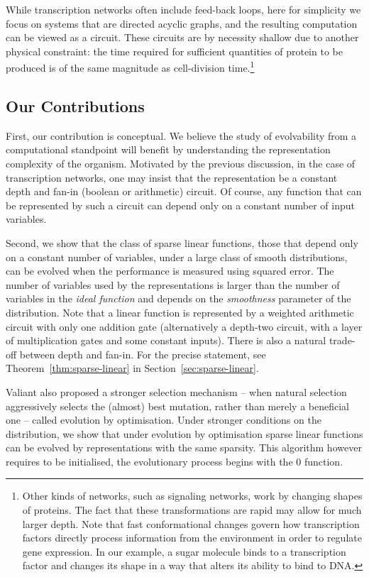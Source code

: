 While transcription networks often include feed-back loops, here for simplicity
we focus on systems that are directed acyclic graphs, and the resulting
computation can be viewed as a circuit.
These circuits are by necessity shallow due to another physical constraint: the
time required for sufficient quantities of protein to be produced is of the same
magnitude as cell-division time.\footnote{Other kinds of networks, such as
signaling networks, work by changing shapes of proteins. The fact that these
transformations are rapid may allow for much larger depth.
Note that fast conformational changes govern how transcription factors directly
process information from the environment in order to regulate gene expression.
In our example, a sugar molecule binds to a transcription factor and changes
its shape in a way that alters its ability to bind to DNA.}

\subsection{Our Contributions}

First, our contribution is conceptual. We believe the study of evolvability from
a computational standpoint will benefit by understanding the representation
complexity of the organism. Motivated by the previous discussion, in the case of
transcription networks, one may insist that the representation be a
constant depth and fan-in (boolean or arithmetic) circuit. Of course, any
function that can be represented by such a circuit can depend only on a constant
number of input variables.

Second, we show that the class of sparse linear functions, those that depend
only on a constant number of variables, under a large class of smooth
distributions, can be evolved when the performance is
measured using squared error. The number of variables used by the
representations is larger than the number of variables in the \emph{ideal
function} and depends on the \emph{smoothness} parameter of the distribution.
Note that a linear function is represented by a weighted arithmetic circuit with
only one addition gate (alternatively a depth-two circuit, with a layer of
multiplication gates and some constant inputs). There is also a natural
trade-off between depth and fan-in. For the precise statement, see
Theorem~\ref{thm:sparse-linear} in Section~\ref{sec:sparse-linear}.

Valiant also proposed a stronger selection mechanism -- when natural selection
aggressively selects the (almost) best mutation, rather than merely a beneficial
one -- called evolution by optimisation.  Under stronger conditions on the
distribution, we show that under evolution by optimisation sparse linear
functions can be evolved by representations with the same sparsity. This
algorithm however requires to be initialised, \ie the evolutionary process
begins with the $0$ function.

